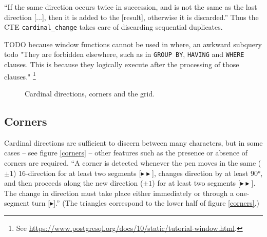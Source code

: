 \documentclass[sigconf]{acmart}
\begin{document}
\enquote{If the same direction occurs twice in succession, and is not the same as the last direction [...], then it is added to the [result], otherwise it is discarded.} \cite{groner} Thus the CTE \texttt{cardinal\_change} takes care of discarding sequential duplicates.

TODO because window functions cannot be used in where, an awkward subquery todo "They are forbidden elsewhere, such as in \texttt{GROUP BY}, \texttt{HAVING} and \texttt{WHERE} clauses. This is because they logically execute after the processing of those clauses." \footnote{See \url{https://www.postgresql.org/docs/10/static/tutorial-window.html}.}

\begin{figure}[pb]
  \centering
  \hspace{0.5cm}
  \caption{Cardinal directions, corners and the grid.}
  \label{cornergrid}
\end{figure}

\subsection{Corners}

Cardinal directions are sufficient to discern between many characters, but in some cases – see figure \ref{corners} – other features such as the presence or absence of corners are required. \enquote{A corner is detected whenever the pen moves in the same ($\pm 1$) 16-direction for at least two segments [{\color[HTML]{21C800}$\blacktriangleright\blacktriangleright$}], changes direction by at least 90°, and then proceeds along the new direction ($\pm 1$) for at least two segments [{\color[HTML]{008AFF}$\blacktriangleright\blacktriangleright$}]. The change in direction must take place either immediately or through a one-segment turn [{\color[HTML]{FFC000}$\blacktriangleright$}].} \cite{groner} (The triangles correspond to the lower half of figure \ref{corners}.)
\end{document}
